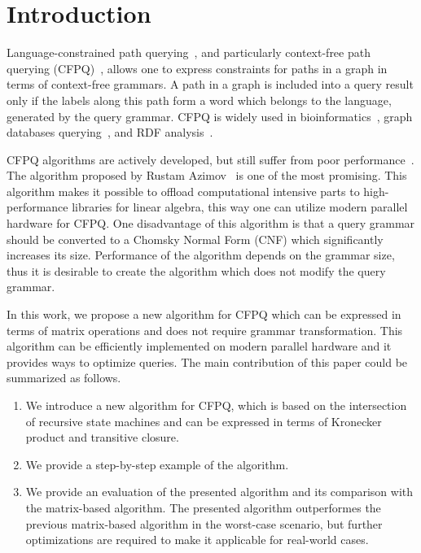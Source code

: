 \section{Introduction}

Language-constrained path querying~\cite{doi:10.1137/S0097539798337716}, and particularly context-free path querying (CFPQ)~\cite{Yannakakis}, allows one to express constraints for paths in a graph in terms of context-free grammars.
A path in a graph is included into a query result only if the labels along this path form a word which belongs to the language, generated by the query grammar.
CFPQ is widely used in bioinformatics~\cite{GraphQueryWithEarley}, graph databases querying~\cite{hellings2015querying,Medeiros:2018:EEC:3167132.3167265,10.1145/3335783.3335791}, and RDF analysis~\cite{RDF}.

CFPQ algorithms are actively developed, but still suffer from poor performance~\cite{10.1145/3335783.3335791}.
The algorithm proposed by Rustam Azimov~\cite{Azimov:2018:CPQ:3210259.3210264} is one of the most promising.
This algorithm makes it possible to offload computational intensive parts to high-performance libraries for linear algebra, this way one can utilize modern parallel hardware for CFPQ.
One disadvantage of this algorithm is that a query grammar should be converted to a Chomsky Normal Form (CNF) which significantly increases its size.
Performance of the algorithm depends on the grammar size, thus it is desirable to create the algorithm which does not modify the query grammar.

In this work, we propose a new algorithm for CFPQ which can be expressed in terms of matrix operations and does not require grammar transformation.
This algorithm can be efficiently implemented on modern parallel hardware and it provides ways to optimize queries.
The main contribution of this paper could be summarized as follows.

\begin{enumerate}
\item We introduce a new algorithm for CFPQ, which is based on the intersection of recursive state machines and can be expressed in terms of Kronecker product and transitive closure.
\item We provide a step-by-step example of the algorithm.
\item We provide an evaluation of the presented algorithm and its comparison with the matrix-based algorithm.
The presented algorithm outperformes the previous matrix-based algorithm in the worst-case scenario, but further optimizations are required to make it applicable for real-world cases.
\end{enumerate}

